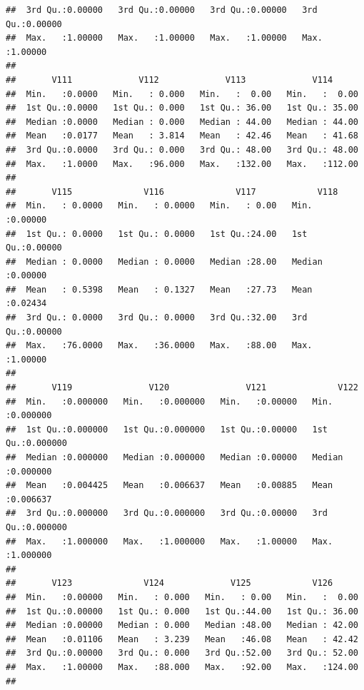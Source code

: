 \documentclass[
]{article}
\begin{document}
\begin{verbatim}
##  3rd Qu.:0.00000   3rd Qu.:0.00000   3rd Qu.:0.00000   3rd Qu.:0.00000  
##  Max.   :1.00000   Max.   :1.00000   Max.   :1.00000   Max.   :1.00000  
##                                                                         
##       V111             V112             V113             V114       
##  Min.   :0.0000   Min.   : 0.000   Min.   :  0.00   Min.   :  0.00  
##  1st Qu.:0.0000   1st Qu.: 0.000   1st Qu.: 36.00   1st Qu.: 35.00  
##  Median :0.0000   Median : 0.000   Median : 44.00   Median : 44.00  
##  Mean   :0.0177   Mean   : 3.814   Mean   : 42.46   Mean   : 41.68  
##  3rd Qu.:0.0000   3rd Qu.: 0.000   3rd Qu.: 48.00   3rd Qu.: 48.00  
##  Max.   :1.0000   Max.   :96.000   Max.   :132.00   Max.   :112.00  
##                                                                     
##       V115              V116              V117            V118        
##  Min.   : 0.0000   Min.   : 0.0000   Min.   : 0.00   Min.   :0.00000  
##  1st Qu.: 0.0000   1st Qu.: 0.0000   1st Qu.:24.00   1st Qu.:0.00000  
##  Median : 0.0000   Median : 0.0000   Median :28.00   Median :0.00000  
##  Mean   : 0.5398   Mean   : 0.1327   Mean   :27.73   Mean   :0.02434  
##  3rd Qu.: 0.0000   3rd Qu.: 0.0000   3rd Qu.:32.00   3rd Qu.:0.00000  
##  Max.   :76.0000   Max.   :36.0000   Max.   :88.00   Max.   :1.00000  
##                                                                       
##       V119               V120               V121              V122         
##  Min.   :0.000000   Min.   :0.000000   Min.   :0.00000   Min.   :0.000000  
##  1st Qu.:0.000000   1st Qu.:0.000000   1st Qu.:0.00000   1st Qu.:0.000000  
##  Median :0.000000   Median :0.000000   Median :0.00000   Median :0.000000  
##  Mean   :0.004425   Mean   :0.006637   Mean   :0.00885   Mean   :0.006637  
##  3rd Qu.:0.000000   3rd Qu.:0.000000   3rd Qu.:0.00000   3rd Qu.:0.000000  
##  Max.   :1.000000   Max.   :1.000000   Max.   :1.00000   Max.   :1.000000  
##                                                                            
##       V123              V124             V125            V126       
##  Min.   :0.00000   Min.   : 0.000   Min.   : 0.00   Min.   :  0.00  
##  1st Qu.:0.00000   1st Qu.: 0.000   1st Qu.:44.00   1st Qu.: 36.00  
##  Median :0.00000   Median : 0.000   Median :48.00   Median : 42.00  
##  Mean   :0.01106   Mean   : 3.239   Mean   :46.08   Mean   : 42.42  
##  3rd Qu.:0.00000   3rd Qu.: 0.000   3rd Qu.:52.00   3rd Qu.: 52.00  
##  Max.   :1.00000   Max.   :88.000   Max.   :92.00   Max.   :124.00  
##                                                                     

\end{verbatim}
\end{document}
